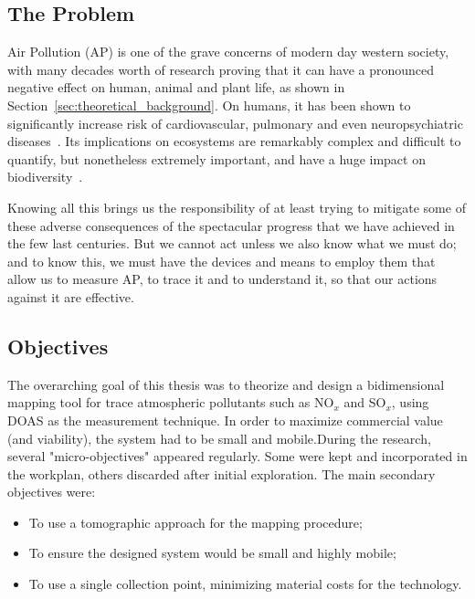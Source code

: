 \subsection{The Problem}%
\label{sub:the_problem}

Air Pollution (\gls{AP}) is one of the grave concerns of modern day
western society, with many decades worth of research proving that it can
have a pronounced negative effect on human, animal and plant life, as
shown in Section~\ref{sec:theoretical_background}. On humans, it has
been shown to significantly increase risk of cardiovascular, pulmonary
and even neuropsychiatric diseases~\cite{Carugno2016, Ghorani-Azam2016,
Kampa2008}. Its implications on ecosystems are remarkably complex and
difficult to quantify, but nonetheless extremely important, and have a
huge impact on biodiversity~\cite{Lovett2009}.

Knowing all this brings us the responsibility of at least trying to
mitigate some of these adverse consequences of the spectacular progress
that we have achieved in the few last centuries. But we cannot act
unless we also know what we must do; and to know this, we must have
the devices and means to employ them that allow us to measure \gls{AP},
to trace it and to understand it, so that our actions against it are
effective.

\subsection{Objectives}%
\label{sub:objectives}

The overarching goal of this thesis was to theorize and design a
bidimensional mapping tool for trace atmospheric pollutants such as
NO$_x$ and SO$_x$, using DOAS as the measurement technique. In order to
maximize commercial value (and viability), the system had to be small
and mobile.During the research, several "micro-objectives" appeared
regularly. Some were kept and incorporated in the workplan, others
discarded after initial exploration. The main secondary objectives were:

\begin{itemize}
    \item To use a tomographic approach for the mapping procedure;
    \item To ensure the designed system would be small and highly
        mobile;
    \item To use a single collection point, minimizing material costs
        for the technology.

\end{itemize}


